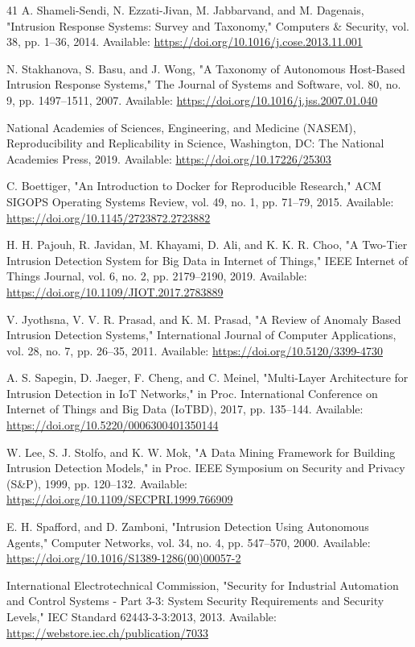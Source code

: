 \documentclass[journal,10pt,onecolumn]{IEEEtran}
\begin{document}
\begin{thebibliography}{41}
 A. Shameli-Sendi, N. Ezzati-Jivan, M. Jabbarvand, and M. Dagenais, "Intrusion Response Systems: Survey and Taxonomy," Computers & Security, vol. 38, pp. 1–36, 2014. Available: \url{https://doi.org/10.1016/j.cose.2013.11.001}

 N. Stakhanova, S. Basu, and J. Wong, "A Taxonomy of Autonomous Host-Based Intrusion Response Systems," The Journal of Systems and Software, vol. 80, no. 9, pp. 1497–1511, 2007. Available: \url{https://doi.org/10.1016/j.jss.2007.01.040}

 National Academies of Sciences, Engineering, and Medicine (NASEM), Reproducibility and Replicability in Science, Washington, DC: The National Academies Press, 2019. Available: \url{https://doi.org/10.17226/25303}

 C. Boettiger, "An Introduction to Docker for Reproducible Research," ACM SIGOPS Operating Systems Review, vol. 49, no. 1, pp. 71–79, 2015. Available: \url{https://doi.org/10.1145/2723872.2723882}

 H. H. Pajouh, R. Javidan, M. Khayami, D. Ali, and K. K. R. Choo, "A Two-Tier Intrusion Detection System for Big Data in Internet of Things," IEEE Internet of Things Journal, vol. 6, no. 2, pp. 2179–2190, 2019. Available: \url{https://doi.org/10.1109/JIOT.2017.2783889}

 V. Jyothsna, V. V. R. Prasad, and K. M. Prasad, "A Review of Anomaly Based Intrusion Detection Systems," International Journal of Computer Applications, vol. 28, no. 7, pp. 26–35, 2011. Available: \url{https://doi.org/10.5120/3399-4730}

 A. S. Sapegin, D. Jaeger, F. Cheng, and C. Meinel, "Multi-Layer Architecture for Intrusion Detection in IoT Networks," in Proc. International Conference on Internet of Things and Big Data (IoTBD), 2017, pp. 135–144. Available: \url{https://doi.org/10.5220/0006300401350144}

 W. Lee, S. J. Stolfo, and K. W. Mok, "A Data Mining Framework for Building Intrusion Detection Models," in Proc. IEEE Symposium on Security and Privacy (S&P), 1999, pp. 120–132. Available: \url{https://doi.org/10.1109/SECPRI.1999.766909}

 E. H. Spafford, and D. Zamboni, "Intrusion Detection Using Autonomous Agents," Computer Networks, vol. 34, no. 4, pp. 547–570, 2000. Available: \url{https://doi.org/10.1016/S1389-1286(00)00057-2}

 International Electrotechnical Commission, "Security for Industrial Automation and Control Systems - Part 3-3: System Security Requirements and Security Levels," IEC Standard 62443-3-3:2013, 2013. Available: \url{https://webstore.iec.ch/publication/7033}


\end{thebibliography}
\end{document}
